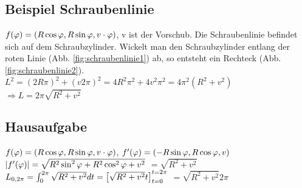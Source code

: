 \subsection{Beispiel Schraubenlinie}
$f(\varphi)= \left( R \cos \varphi, R \sin \varphi, v\cdot \varphi \right) $, v ist der Vorschub. Die Schraubenlinie befindet sich auf dem Schraubzylinder. Wickelt man den Schraubzylinder entlang der roten Linie (Abb. \ref{fig:schraubenlinie1}) ab, so entsteht ein Rechteck (Abb. \ref{fig:schraubenlinie2}). 
$L^2 = (2R\pi)^2 + (v2\pi)^2 = 4R^2 \pi^2 + 4v^2 \pi^2 = 4\pi^2(R^2+v^2)$
$\Rightarrow L=2\pi \sqrt{R^2 + v^2}$

\subsection{Hausaufgabe}
$f(\varphi)= \left( R \cos \varphi, R \sin \varphi, v\cdot \varphi \right) $, $f'(\varphi)= \left( -R \sin \varphi, R \cos \varphi, v \right) $\\
$ \left\vert f'(\varphi) \right\vert = \sqrt{R^2 \sin ^2 \varphi + R^2 \cos^2 \varphi + v^2}$
$= \sqrt{R^2 + v^2}$\\
$L_{0,2\pi}=\int_{0}^{2\pi} \sqrt{R^2 + v^2} dt =  \left[ \sqrt{R^2 + v^2} t \right] _{t=0}^{t=2\pi}$
\underline{$= \sqrt{R^2 + v^2} 2\pi$}
